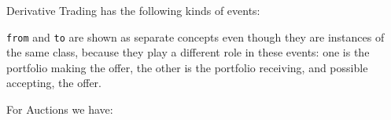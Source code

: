 \documentclass[a4]{article}
\begin{document}
Derivative Trading has the following kinds of events:
\begin{figure}
\noindent{}
\end{figure}

\texttt{from} and \texttt{to} are shown as separate concepts even though they are
instances of the same class, because they play a different role in these
events: one is the portfolio making the offer, the other is the portfolio
receiving, and possible accepting, the offer.

For Auctions we have:
\begin{figure}
\noindent{}
\end{figure}
\end{document}
